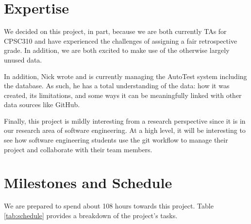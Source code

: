 \documentclass[preprint,journal]{vgtc}       %
\begin{document}
\section{Expertise}
We decided on this project, in part, because we are both currently TAs for CPSC310
and have experienced the challenges of assigning a fair retrospective grade. In
addition, we are both excited to make use of the otherwise largely unused data.

In addition, Nick wrote and is currently managing the AutoTest system including
the database. As such, he has a total understanding of the data: how it was created,
its limitations, and some ways it can be meaningfully linked with other data sources
like GitHub.

Finally, this project is mildly interesting from a research perspective since it
is in our research area of software engineering. At a high level, it will be
interesting to see how software engineering students use the git workflow to
manage their project and collaborate with their team members.

\section{Milestones and Schedule}
We are prepared to spend about 108 hours towards this project. Table \ref{tab:schedule} provides
a breakdown of the project's tasks.
\end{document}

